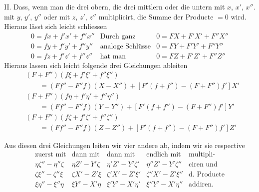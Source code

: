 II. Dass, wenn man die drei obern, die drei mittlern oder die untern mit $x$, $x'$, $x''$. mit $y$, $y'$, $y''$ oder mit $z$, $z'$, $z''$ multiplicirt, die Summe der Producte $=0$ wird. Hieraus lässt sich leicht schliessen
\[
\begin{array}{r|c|l}
0=fx+f'x'+f''x''&\text{Durch ganz}&0=FX+F'X'+F''X''\\
0=fy+f'y'+f''y''&\text{analoge Schlüsse}&0=FY+F'Y'+F''Y''\\
0=fz+f'z'+f''z''&\text{hat man}&0=FZ+F'Z'+F''Z''
\end{array}
\]
%
Hieraus lassen sich leicht folgende drei Gleichungen ableiten
\[
\begin{aligned}
&(F+F'')(f\xi+f'\xi'+f''\xi'')\\
&\qquad=(Ff''-F''f)(X-X'')+[F'(f+f'')-(F+F'')f']X'\\
&(F+F'')(f\eta+f'\eta'+f''\eta'')\\
&\qquad=(Ff''-F''f)(Y-Y'')+[F'(f+f'')-(F+F'')f']Y'\\
&(F+F'')(f\zeta+f'\zeta'+f''\zeta'')\\
&\qquad=(Ff''-F''f)(Z-Z'')+[F'(f+f'')-(F+F'')f']Z'
\end{aligned}
\]

Aus diesen drei Gleichungen leiten wir vier andere ab, indem wir sie respective
\[
\begin{array}{c|c|c|c|l}
\text{zuerst mit}&\text{dann mit}&\text{dann mit}&\text{endlich mit}&\text{multipli-}\\
\eta\zeta''-\eta''\zeta&\eta Z'-Y'\zeta&\eta'Z'-Y'\zeta'&\eta''Z'-Y'\zeta''&\text{ciren und}\\
\zeta\xi''-\zeta''\xi&\zeta X'-Z'\xi&\zeta'X'-Z'\xi'&\zeta''X'-Z'\xi''&\text{d.\ Producte}\\
\xi\eta''-\xi''\eta&\xi Y'-X'\eta&\xi'Y'-X'\eta'&\xi''Y'-X'\eta''&\text{addiren.}
\end{array}
\]

